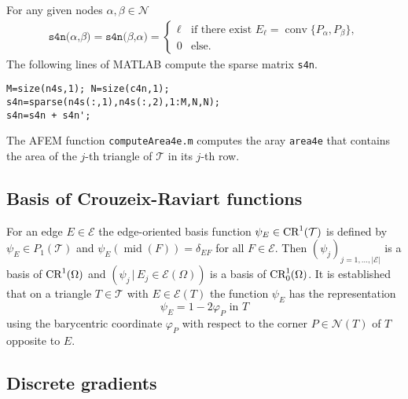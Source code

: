 %
For any given nodes $\alpha,\beta\in\mathcal{N}$
\begin{align*}
\texttt{s4n($\alpha$,$\beta$)} =
\texttt{s4n($\beta$,$\alpha$)} =
\begin{cases}
 \ell & \text{if there exist } E_\ell = \operatorname*{conv} \{ P_\alpha, P_\beta \},\\
    0 & \text{else.}
\end{cases}
\end{align*}
The following lines of MATLAB compute the sparse matrix \texttt{s4n}.
\begin{lstlisting}[frame=single,numbers=none]
M=size(n4s,1); N=size(c4n,1);
s4n=sparse(n4s(:,1),n4s(:,2),1:M,N,N);
s4n=s4n + s4n';
\end{lstlisting}
The AFEM function \texttt{computeArea4e.m} computes the 
aray \texttt{area4e} that contains the area of the $j$-th 
triangle of $\mathcal T$ 
in its $j$-th row.


\subsection{Basis of Crouzeix-Raviart functions \cite{Carstensen2017script}}
For an edge $E\in\mathcal E$ the edge-oriented basis function
$\psi_E\in\textup{CR}^1(\mathcal T)$ is defined by
$\psi_E\in P_1(\mathcal T)$ and
$
\psi_E(\operatorname{mid}(F))=\delta_{EF} 
$ for all $F\in\mathcal E$.
Then $(\psi_j)_{j=1,\dots,|\mathcal{E}|}$ is a basis of $\textup{CR}^1(\Omega)$
and $(\psi_j \, | \, E_j\in\mathcal{E}(\Omega))$ is a basis of $\textup{CR}^1_0(\Omega)$.
It is established that on a triangle $T\in\mathcal T$ with $E\in\mathcal E (T)$ the
function
$\psi_E$ has the representation
\[
\psi_E = 1-2\varphi_P \text{ in } T
\] using the barycentric coordinate $\varphi_P$ with respect to 
the corner $P\in\mathcal N (T)$ of $T$ opposite to $E$.

\subsection{Discrete gradients }\label{sec:DiscreteGradients}


